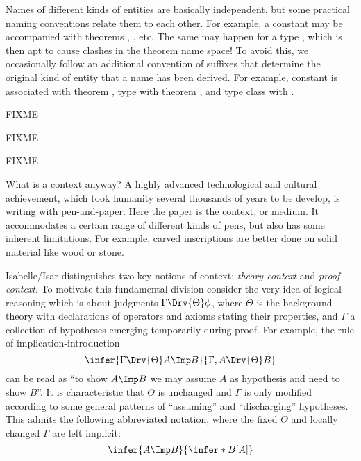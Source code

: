 \begin{isabellebody}
\begin{isamarkuptext}
Names of different kinds of entities are basically independent, but
some practical naming conventions relate them to each other.  For
example, a constant  may be accompanied with theorems
, ,  etc.  The
same may happen for a type , which is then apt to cause
clashes in the theorem name space!  To avoid this, we occasionally
follow an additional convention of suffixes that determine the
original kind of entity that a name has been derived.  For example,
constant  is associated with theorem ,
type  with theorem , and type
class  with .%
\end{isamarkuptext}%
\isamarkuptrue%
%
\endisatagFIXME
{\isafoldFIXME}%
%
\isadelimFIXME
%
\endisadelimFIXME
%
\isamarkuptrue%
%
\isamarkuptrue%
%
\begin{isamarkuptext}%
FIXME%
\end{isamarkuptext}%
\isamarkuptrue%
%
\isamarkuptrue%
%
\begin{isamarkuptext}%
FIXME%
\end{isamarkuptext}%
\isamarkuptrue%
%
\isamarkuptrue%
%
\begin{isamarkuptext}%
FIXME%
\end{isamarkuptext}%
\isamarkuptrue%
%
\isamarkuptrue%
%
\isadelimFIXME
%
\endisadelimFIXME
%
\isatagFIXME
%
\begin{isamarkuptext}%
What is a context anyway?  A highly advanced
technological and cultural achievement, which took humanity several
thousands of years to be develop, is writing with pen-and-paper.  Here
the paper is the context, or medium.  It accommodates a certain range
of different kinds of pens, but also has some inherent limitations.
For example, carved inscriptions are better done on solid material
like wood or stone.

Isabelle/Isar distinguishes two key notions of context: \emph{theory
context} and \emph{proof context}.  To motivate this fundamental
division consider the very idea of logical reasoning which is about
judgments $\Gamma \Drv{\Theta} \phi$, where $\Theta$ is the background
theory with declarations of operators and axioms stating their
properties, and $\Gamma$ a collection of hypotheses emerging
temporarily during proof.  For example, the rule of
implication-introduction \[ \infer{\Gamma \Drv{\Theta} A \Imp
B}{\Gamma, A \Drv{\Theta} B} \] can be read as ``to show $A \Imp B$ we
may assume $A$ as hypothesis and need to show $B$''.  It is
characteristic that $\Theta$ is unchanged and $\Gamma$ is only
modified according to some general patterns of ``assuming'' and
``discharging'' hypotheses.  This admits the following abbreviated
notation, where the fixed $\Theta$ and locally changed $\Gamma$ are
left implicit: \[ \infer{A \Imp B}{\infer*{B}{[A]}} \]


\end{isamarkuptext}
\end{isabellebody}
